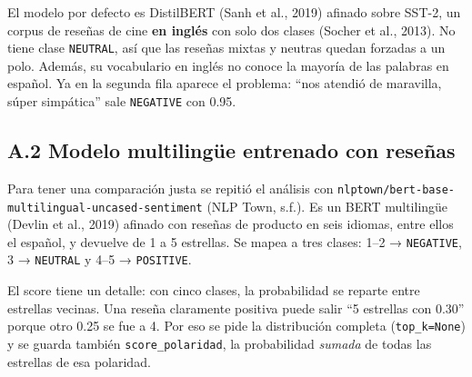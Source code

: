 \documentclass[12pt,a4paper]{article}
\begin{document}
El modelo por defecto es DistilBERT (Sanh et al., 2019) afinado sobre SST-2, un corpus de
reseñas de cine \textbf{en inglés} con solo dos clases (Socher et al., 2013). No tiene clase
\texttt{NEUTRAL}, así que las reseñas mixtas y neutras quedan forzadas a un polo. Además, su
vocabulario en inglés no conoce la mayoría de las palabras en español. Ya en la segunda fila
aparece el problema: ``nos atendió de maravilla, súper simpática'' sale \texttt{NEGATIVE} con 0.95.

\subsection{A.2 Modelo multilingüe entrenado con reseñas}

Para tener una comparación justa se repitió el análisis con \nolinkurl{nlptown/bert-base-multilingual-uncased-sentiment}
(NLP Town, s.f.). Es un BERT multilingüe (Devlin et al., 2019) afinado con reseñas de producto en
seis idiomas, entre ellos el español, y devuelve de 1 a 5 estrellas. Se mapea a tres clases:
1--2 → \texttt{NEGATIVE}, 3 → \texttt{NEUTRAL} y 4--5 → \texttt{POSITIVE}.

El score tiene un detalle: con cinco clases, la probabilidad se reparte entre estrellas vecinas.
Una reseña claramente positiva puede salir ``5 estrellas con 0.30'' porque otro 0.25 se fue a 4.
Por eso se pide la distribución completa (\texttt{top\_k=None}) y se guarda también
\texttt{score\_polaridad}, la probabilidad \emph{sumada} de todas las estrellas de esa polaridad.
\end{document}
